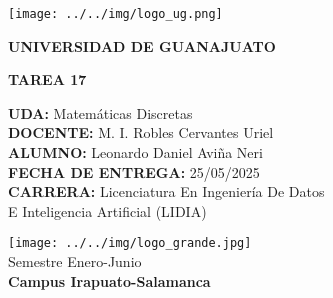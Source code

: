 \documentclass{report} %
\begin{document}

\begin{titlepage} %


    \begin{flushleft}
        \texttt{[image: ../../img/logo\_ug.png]} %
    \end{flushleft}

    \begin{flushright}
        \vspace{-1.6cm}
        \textbf{UNIVERSIDAD DE GUANAJUATO}
    \end{flushright}

    \vspace{2cm}

    
    \begin{center}
        \huge{
            \textbf{TAREA 17}
        }
    \end{center}

    \vspace{2cm}
    
    \begin{flushleft}
        \hspace*{4cm}
        \textbf{UDA: }Matemáticas Discretas \\
        \hspace*{4cm}
        \textbf{DOCENTE: }M. I. Robles Cervantes Uriel  \\
        \hspace*{4cm}
        \textbf{ALUMNO: }Leonardo Daniel Aviña Neri \\
        \hspace*{4cm}
        \textbf{FECHA DE ENTREGA: } 25/05/2025 \\
        \hspace*{4cm}
        \textbf{CARRERA:} Licenciatura En Ingeniería De Datos \\
        \hspace*{4cm}
        E Inteligencia Artificial (LIDIA) \\
        \hspace*{4cm}
    \end{flushleft}

    \vfill

    \begin{center}
        \texttt{[image: ../../img/logo\_grande.jpg]} \\ %
        \vspace{0.3cm}
        Semestre Enero-Junio \the\year \\
        \textbf{Campus Irapuato-Salamanca}
    \end{center}
\end{titlepage}
\end{document}
